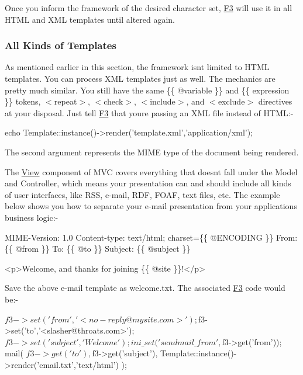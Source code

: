 Once you inform the framework of the desired character set, \hyperlink{class_f3}{F3} will use it in all H\+T\+ML and X\+ML templates until altered again.

\subsubsection*{All Kinds of Templates}

As mentioned earlier in this section, the framework isn\textquotesingle{}t limited to H\+T\+ML templates. You can process X\+ML templates just as well. The mechanics are pretty much similar. You still have the same {\ttfamily \{\{ @variable \}\}} and {\ttfamily \{\{ expression \}\}} tokens, {\ttfamily $<$repeat$>$}, {\ttfamily $<$check$>$}, {\ttfamily $<$include$>$}, and {\ttfamily $<$exclude$>$} directives at your disposal. Just tell \hyperlink{class_f3}{F3} that you\textquotesingle{}re passing an X\+ML file instead of H\+T\+ML\+:-\/


\begin{DoxyCode}
echo Template::instance()->render('template.xml','application/xml');
\end{DoxyCode}


The second argument represents the M\+I\+ME type of the document being rendered.

The \hyperlink{class_view}{View} component of M\+VC covers everything that doesn\textquotesingle{}t fall under the Model and Controller, which means your presentation can and should include all kinds of user interfaces, like R\+SS, e-\/mail, R\+DF, F\+O\+AF, text files, etc. The example below shows you how to separate your e-\/mail presentation from your application\textquotesingle{}s business logic\+:-\/


\begin{DoxyCode}
MIME-Version: 1.0
Content-type: text/html; charset=\{\{ @ENCODING \}\}
From: \{\{ @from \}\}
To: \{\{ @to \}\}
Subject: \{\{ @subject \}\}

<p>Welcome, and thanks for joining \{\{ @site \}\}!</p>
\end{DoxyCode}


Save the above e-\/mail template as welcome.\+txt. The associated \hyperlink{class_f3}{F3} code would be\+:-\/


\begin{DoxyCode}
$f3->set('from','<no-reply@mysite.com>');
$f3->set('to','<slasher@throats.com>');
$f3->set('subject','Welcome');
ini\_set('sendmail\_from',$f3->get('from'));
mail(
    $f3->get('to'),
    $f3->get('subject'),
    Template::instance()->render('email.txt','text/html')
);
\end{DoxyCode}


